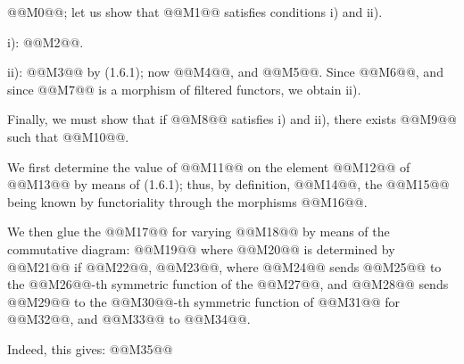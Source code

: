 @@M0@@;
let us show that @@M1@@ satisfies conditions i) and ii).

i): @@M2@@.

ii): @@M3@@ by (1.6.1); now @@M4@@, and @@M5@@. Since @@M6@@, and since @@M7@@ is a morphism of filtered functors, we obtain ii).

Finally, we must show that if @@M8@@ satisfies i) and ii), there exists @@M9@@ such that @@M10@@.

We first determine the value of @@M11@@ on the element @@M12@@ of @@M13@@ by means of (1.6.1); thus, by definition, @@M14@@, the @@M15@@ being known by functoriality through the morphisms @@M16@@.

We then glue the @@M17@@ for varying @@M18@@ by means of the commutative diagram:
@@M19@@
where @@M20@@ is determined by @@M21@@ if @@M22@@, @@M23@@, where @@M24@@ sends @@M25@@ to the @@M26@@-th symmetric function of the @@M27@@, and @@M28@@ sends @@M29@@ to the @@M30@@-th symmetric function of @@M31@@ for @@M32@@, and @@M33@@ to @@M34@@.

Indeed, this gives:
@@M35@@
